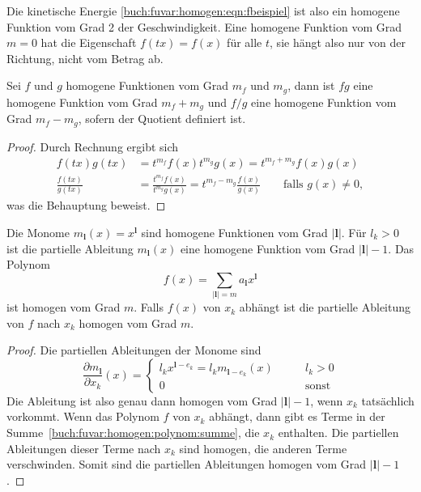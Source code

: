 Die kinetische Energie \eqref{buch:fuvar:homogen:eqn:fbeispiel} ist
also ein homogene Funktion vom Grad 2 der Geschwindigkeit.
Eine homogene Funktion vom Grad $m=0$ hat die Eigenschaft
$f(tx)=f(x)$ für alle $t$, sie hängt also nur von der Richtung, nicht
vom Betrag ab.

\begin{satz}
\label{buch:fuvar:homogen:satz:produktquotient}
Sei $f$ und $g$ homogene Funktionen vom Grad $m_f$ und $m_g$, dann ist
$fg$ eine homogene Funktion vom Grad $m_f+m_g$ und $f/g$ 
eine homogene Funktion vom Grad $m_f-m_g$, sofern der Quotient
definiert ist.
\end{satz}

\begin{proof}
Durch Rechnung ergibt sich
\begin{align*}
f(tx)g(tx)
&=
t^{m_f}f(x) t^{m_g}g(x)
=
t^{m_f+m_g}f(x)g(x)
\\
\frac{f(tx)}{g(tx)}
&=
\frac{t^{m_f}f(x)}{t^{m_g}g(x)}
=
t^{m_f-m_g}\frac{f(x)}{g(x)}\qquad \text{falls $g(x)\ne 0$},
\end{align*}
was die Behauptung beweist.
\end{proof}

\begin{satz}
\label{buch:fuvar:homogen:satz:polynom}
Die Monome $m_{\mathbf{l}}(x)=x^\mathbf{l}$ sind homogene Funktionen
vom Grad $|\mathbf{l}|$.
Für $l_k>0$ ist die partielle Ableitung $m_{\mathbf{l}}(x)$ eine
homogene Funktion vom Grad $|\mathbf{l}|-1$.
Das Polynom
\begin{equation}
f(x) = \sum_{|\mathbf{l}| = m} a_{\mathbf{l}} x^{\mathbf{l}}
\label{buch:fuvar:homogen:polynom:summe}
\end{equation}
ist homogen vom Grad $m$.
Falls $f(x)$ von $x_k$ abhängt ist die partielle Ableitung von
$f$ nach $x_k$ homogen vom Grad $m$.
\end{satz}

\begin{proof}
Die partiellen Ableitungen der Monome sind
\[
\frac{\partial m_{\mathbf{l}}}{\partial x_k}(x)
=
\begin{cases}
l_kx^{\mathbf{l}-e_k}=l_km_{\mathbf{l}-e_k}(x)&\qquad l_k > 0     \\
0                                             &\qquad \text{sonst}
\end{cases}
\]
Die Ableitung ist also genau dann homogen vom Grad $|\mathbf{l}|-1$,
wenn $x_k$ tatsächlich vorkommt.
Wenn das Polynom $f$ von $x_k$ abhängt, dann gibt es Terme in der
Summe~\eqref{buch:fuvar:homogen:polynom:summe}, die $x_k$ enthalten.
Die partiellen Ableitungen dieser Terme nach $x_k$ sind homogen,
die anderen Terme verschwinden.
Somit sind die partiellen Ableitungen homogen vom Grad $|\mathbf{l}|-1$.
\end{proof}

